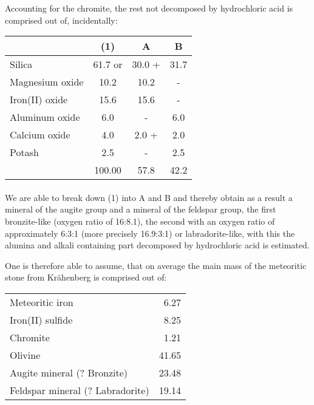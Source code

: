 \documentclass[a4paper, 12pt, oneside]{article}
\begin{document}
Accounting for the chromite, the rest not decomposed by hydrochloric acid is comprised out of, incidentally:
\begin{center}
    \begin{tabular}{ |l|c|c|c| }
        \hline
        & (1) & A & B\\\hline
        Silica & 61.7 or & 30.0 + & 31.7\\\hline
        Magnesium oxide & 10.2 & 10.2 & -\\\hline
        Iron(II) oxide & 15.6 & 15.6 & -\\\hline
        Aluminum oxide & 6.0 & - & 6.0\\\hline
        Calcium oxide & 4.0 & 2.0 + & 2.0\\\hline
        Potash & 2.5 & - & 2.5\\\hline
        & 100.00 & 57.8 & 42.2\\
        \hline
    \end{tabular}
\end{center}
\paragraph{}
We are able to break down (1) into A and B and thereby obtain as a result a mineral of the augite group and a mineral of the feldspar group, the first bronzite-like (oxygen ratio of 16:8.1), the second with an oxygen ratio of approximately 6:3:1 (more precisely 16.9:3:1) or labradorite-like, with this the alumina and alkali containing part decomposed by hydrochloric acid is estimated.

One is therefore able to assume, that on average the main mass of the meteoritic stone from Krähenberg is comprised out of:
\begin{center}
    \begin{tabular}{l r}
        Meteoritic iron & 6.27\\
        Iron(II) sulfide & 8.25\\
        Chromite & 1.21\\
        Olivine & 41.65\\
        Augite mineral (? Bronzite) & 23.48\\
        Feldspar mineral (? Labradorite) & 19.14\\
    \end{tabular}
\end{center}
\end{document}
